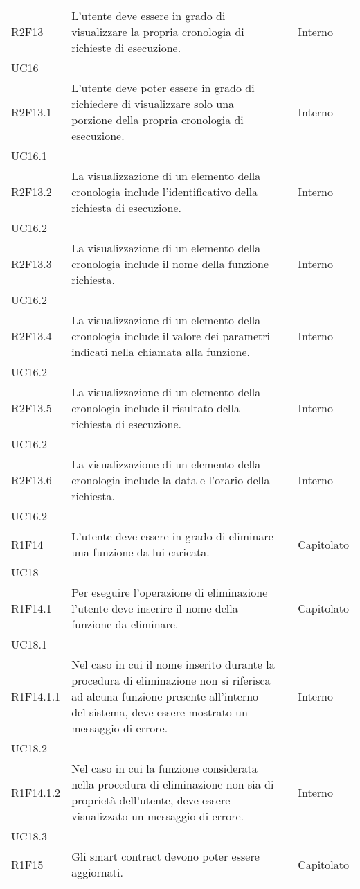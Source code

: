 \begin{longtable}{ 
		>{\centering}p{} 
		>{}p{} 
		>{\centering}p{}
		>{\centering}p{} }
	R2F13 & L'utente deve essere in grado di visualizzare la propria cronologia 
		di richieste di esecuzione. 													& \de & Interno \\ UC16 \tabularnewline
	R2F13.1 & L'utente deve poter essere in grado di richiedere di visualizzare
		solo una porzione della propria cronologia di esecuzione. 					& \de & Interno \\ UC16.1 \tabularnewline
	R2F13.2 & La visualizzazione di un elemento della cronologia include 
		l'identificativo della richiesta di esecuzione. 								& \de & Interno \\ UC16.2 \tabularnewline
	R2F13.3 & La visualizzazione di un elemento della cronologia include 
		il nome della funzione richiesta. 											& \de & Interno \\ UC16.2 \tabularnewline				
	R2F13.4 & La visualizzazione di un elemento della cronologia include 
		il valore dei parametri indicati nella chiamata alla funzione.				& \de & Interno \\ UC16.2 \tabularnewline
	R2F13.5 & La visualizzazione di un elemento della cronologia include 
		il risultato della richiesta di esecuzione.									& \de & Interno \\ UC16.2 \tabularnewline
	R2F13.6 & La visualizzazione di un elemento della cronologia include 
		la data e l'orario della richiesta. 											& \de & Interno \\ UC16.2 \tabularnewline
	
	R1F14 & L'utente deve essere in grado di eliminare una funzione da lui caricata. & \ob & Capitolato \\ UC18 \tabularnewline
	R1F14.1 & Per eseguire l'operazione di eliminazione l'utente deve inserire 
		il nome della funzione da eliminare. 										& \ob & Capitolato \\ UC18.1 \tabularnewline
	R1F14.1.1 & Nel caso in cui il nome inserito durante la procedura di eliminazione
		non si riferisca ad alcuna funzione presente all'interno del sistema, deve 
		essere mostrato un messaggio di errore.										& \ob & Interno \\ UC18.2 \tabularnewline
	R1F14.1.2 & Nel caso in cui la funzione considerata nella procedura di eliminazione
		non sia di proprietà dell'utente, deve essere visualizzato un messaggio 
		di errore.																	& \ob & Interno \\ UC18.3 \tabularnewline
	
	R1F15 & Gli smart contract\ped{\textit{G}} devono poter essere aggiornati. 				& \ob & Capitolato \tabularnewline
\end{longtable}